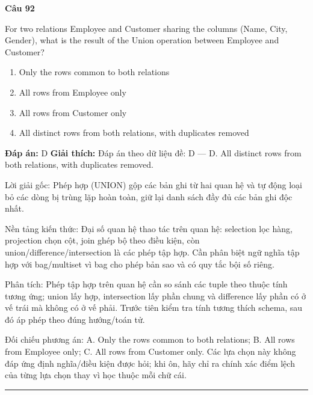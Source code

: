 \documentclass[11pt,a4paper]{article}
\newenvironment{question}[1]{%
  \par\vspace{1em}\noindent\textbf{\large Câu #1}\par\vspace{0.4em}
}{%
  \par\vspace{1em}\hrule\vspace{0.6em}
}
\newenvironment{choices}{%
  \begin{enumerate}[label=\textbf{\Alph*.},leftmargin=2.2em,itemsep=2pt,topsep=3pt]
}{%
  \end{enumerate}
}
\newcommand{\choice}{\item}
\begin{document}
\begin{question}{92}
For two relations Employee and Customer sharing the columns (Name, City, Gender), what is the result of the Union operation between Employee and Customer?
\begin{choices}
\choice Only the rows common to both relations
\choice All rows from Employee only
\choice All rows from Customer only
\choice All distinct rows from both relations, with duplicates removed
\end{choices}
\textbf{Đáp án:} D
\textbf{Giải thích:} Đáp án theo dữ liệu đề: D — D. All distinct rows from both relations, with duplicates removed.

Lời giải gốc: Phép hợp (UNION) gộp các bản ghi từ hai quan hệ và tự động loại bỏ các dòng bị trùng lặp hoàn toàn, giữ lại danh sách đầy đủ các bản ghi độc nhất.

Nền tảng kiến thức: Đại số quan hệ thao tác trên quan hệ: selection lọc hàng, projection chọn cột, join ghép bộ theo điều kiện, còn union/difference/intersection là các phép tập hợp. Cần phân biệt ngữ nghĩa tập hợp với bag/multiset vì bag cho phép bản sao và có quy tắc bội số riêng.

Phân tích: Phép tập hợp trên quan hệ cần so sánh các tuple theo thuộc tính tương ứng; union lấy hợp, intersection lấy phần chung và difference lấy phần có ở vế trái mà không có ở vế phải. Trước tiên kiểm tra tính tương thích schema, sau đó áp phép theo đúng hướng/toán tử.

Đối chiếu phương án: A. Only the rows common to both relations; B. All rows from Employee only; C. All rows from Customer only. Các lựa chọn này không đáp ứng định nghĩa/điều kiện được hỏi; khi ôn, hãy chỉ ra chính xác điểm lệch của từng lựa chọn thay vì học thuộc mỗi chữ cái.
\end{question}
\end{document}

